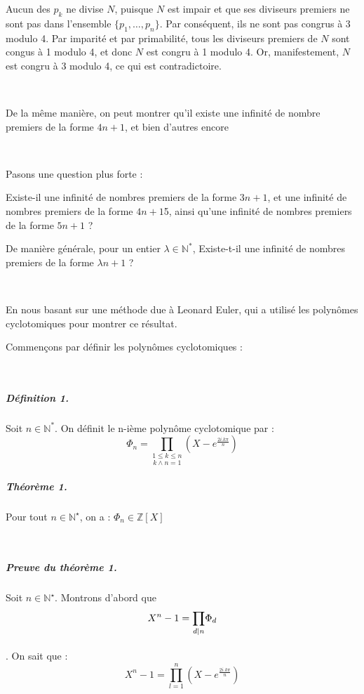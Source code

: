 Aucun des $p_k$ ne divise $N$, puisque $N$ est impair et que ses diviseurs
premiers ne sont pas dans l'ensemble $\{ p_1, \ldots, p_n \}$. Par
cons{\'e}quent, ils ne sont pas congrus {\`a} 3 modulo 4. Par imparit{\'e} et
par primabilit{\'e}, tous les diviseurs premiers de $N$ sont congus {\`a} 1
modulo 4, et donc $N$ est congru {\`a} 1 modulo 4. Or, manifestement, $N$ est
congru {\`a} 3 modulo 4, ce qui est contradictoire.

\

De la m{\^e}me mani{\`e}re, on peut montrer qu'il existe une infinit{\'e} de
nombre premiers de la forme $4 n + 1$, et bien d'autres encore{\textdots}

\

Pasons une question plus forte :


Existe-il une infinit{\'e} de nombres premiers de la forme $3 n + 1$, et une
infinit{\'e} de nombres premiers de la forme $4 n + 1$5, ainsi qu'une
infinit{\'e} de nombres premiers de la forme $5 n + 1${\textdots} ?

De mani{\`e}re g{\'e}n{\'e}rale, pour un entier $\lambda \in
\mathbb{N}^{\ast}$, Existe-t-il une infinit{\'e} de nombres premiers de la
forme $\lambda n + 1$ ?

\


En nous basant sur une m{\'e}thode due {\`a} Leonard Euler, qui a utilis{\'e}
les polyn{\^o}mes cyclotomiques pour montrer ce r{\'e}sultat.

Commen{\c c}ons par d{\'e}finir les polyn{\^o}mes cyclotomiques :

\

\subparagraph{D{\'e}finition 1.}

Soit $n \in \mathbb{N}^{\ast}$. On d{\'e}finit le n-i{\`e}me polyn{\^o}me
cyclotomique par :
\[ \Phi_n = \underset{k \wedge n = 1}{\underset{1 \leqslant k \leqslant
   n}{\prod}} \left( X - e^{\frac{2 i.k \pi}{n}} \right) \]


\subparagraph{Th{\'e}or{\`e}me 1.}

Pour tout $n \in \mathbb{N}^{\star}$, on a : $\Phi_n \in \mathbb{Z} [X]$

\

\subparagraph{Preuve du th{\'e}or{\`e}me 1.}

Soit $n \in \mathbb{N}^{\star}$. Montrons d'abord que
\[ X^n - 1 = \underset{}{\underset{d | n }{\prod} \Phi_d} \]
. On sait que :
\[ X^n - 1 = \underset{}{\overset{n}{\underset{l = 1}{\prod}}  \left( X -
   e^{\frac{2 i.k \pi}{n}} \right)} \]


